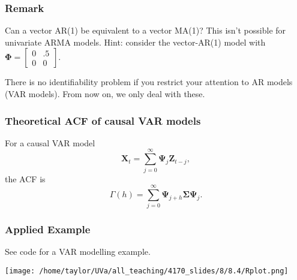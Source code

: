 \documentclass{beamer}
\begin{document}

\begin{frame}
\frametitle{Remark}

Can a vector AR(1) be equivalent to a vector MA(1)? This isn't possible for univariate ARMA models. Hint: consider the vector-AR(1) model with $\bm{\Phi} = \left[ \begin{array}{cc} 0 & .5 \\ 0 & 0 \end{array}\right]$.
\newline
\pause

There is no identifiability problem if you restrict your attention to AR models (VAR models). From now on, we only deal with these.




\end{frame}


\begin{frame}
\frametitle{Theoretical ACF of causal VAR models}

For a causal VAR model
\[
\mathbf{X}_t = \sum_{j=0}^{\infty} \bm{\Psi}_j \mathbf{Z}_{t-j},
\]
the ACF is
\[
\Gamma(h) = \sum_{j=0}^{\infty}\bm{\Psi}_{j+h} \bm{\Sigma} \bm{\Psi}_{j}.
\]

\end{frame}


\begin{frame}
\frametitle{Applied Example}

See code for a VAR modelling example.
\begin{center}
\texttt{[image: /home/taylor/UVa/all\_teaching/4170\_slides/8/8.4/Rplot.png]}
\end{center}

\end{frame}
\end{document}
